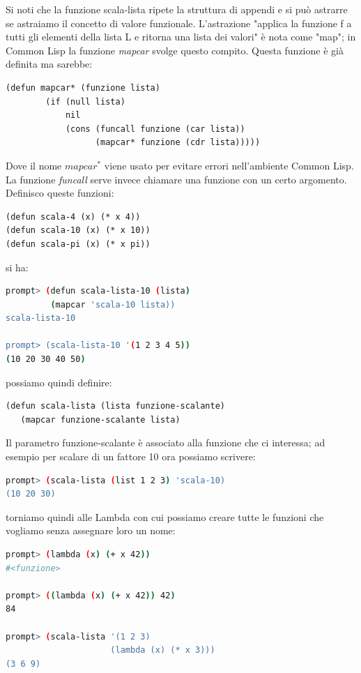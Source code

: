 \documentclass[a4paper,12pt, oneside]{book}
\begin{document}
Si noti che la funzione scala-lista ripete la struttura di appendi e si può astrarre se astraiamo il
concetto di valore funzionale. L'astrazione "applica la funzione f a tutti gli elementi della lista L e ritorna una
lista dei valori" è nota come "map"; in Common Lisp la funzione \textit{mapcar }svolge
questo compito. Questa funzione è già definita ma sarebbe:
\begin{verbatim}
(defun mapcar* (funzione lista)
        (if (null lista)
            nil
            (cons (funcall funzione (car lista))
                  (mapcar* funzione (cdr lista)))))
\end{verbatim}
Dove il nome $mapcar^*$ viene usato per evitare errori nell'ambiente Common Lisp. La funzione \textit{funcall} serve invece chiamare una funzione con un certo argomento.\\
Definisco queste funzioni:
\begin{verbatim}
(defun scala-4 (x) (* x 4))
(defun scala-10 (x) (* x 10))
(defun scala-pi (x) (* x pi))
\end{verbatim}
si ha:
\begin{shaded}
\begin{lstlisting}[language=bash]
prompt> (defun scala-lista-10 (lista)
         (mapcar 'scala-10 lista))
scala-lista-10

prompt> (scala-lista-10 '(1 2 3 4 5))
(10 20 30 40 50)
\end{lstlisting}
\end{shaded}
possiamo quindi definire:
\begin{verbatim}
(defun scala-lista (lista funzione-scalante)
   (mapcar funzione-scalante lista)
\end{verbatim}
Il parametro funzione-scalante è associato alla funzione che ci interessa; ad esempio per scalare di un fattore 10 ora possiamo scrivere:
\begin{shaded}
\begin{lstlisting}[language=bash]
prompt> (scala-lista (list 1 2 3) 'scala-10)
(10 20 30)
\end{lstlisting}
\end{shaded}
torniamo quindi alle Lambda con cui possiamo creare tutte le funzioni che
vogliamo senza assegnare loro un nome:
\begin{shaded}
\begin{lstlisting}[language=bash]
prompt> (lambda (x) (+ x 42))
#<funzione>

prompt> ((lambda (x) (+ x 42)) 42)
84

prompt> (scala-lista '(1 2 3)
                     (lambda (x) (* x 3)))
(3 6 9)
\end{lstlisting}
\end{shaded}
\end{document}
